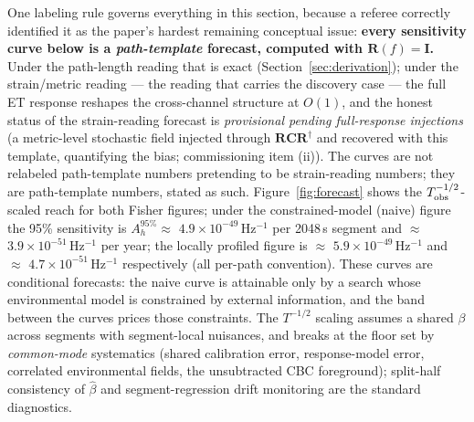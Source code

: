 \documentclass[11pt]{article}
\newcommand{\Ah}{A_h}
\newcommand{\betaeff}{\beta}
\begin{document}
One labeling rule governs everything in this section, because a referee correctly identified it as the paper's hardest remaining conceptual issue: \textbf{every sensitivity curve below is a \emph{path-template} forecast, computed with $\mathbf{R}(f) = \mathbf{I}$.} Under the path-length reading that is exact (Section~\ref{sec:derivation}); under the strain/metric reading --- the reading that carries the discovery case --- the full ET response reshapes the cross-channel structure at $O(1)$, and the honest status of the strain-reading forecast is \emph{provisional pending full-response injections} (a metric-level stochastic field injected through $\mathbf{R}\mathbf{C}\mathbf{R}^\dagger$ and recovered with this template, quantifying the bias; commissioning item (ii)). The curves are not relabeled path-template numbers pretending to be strain-reading numbers; they are path-template numbers, stated as such. Figure~\ref{fig:forecast} shows the $T_{\rm obs}^{-1/2}$-scaled reach for both Fisher figures; under the constrained-model (naive) figure the 95\% sensitivity is $\Ah^{95\%} \approx$ $4.9\times10^{-49}$$\,\mathrm{Hz^{-1}}$ per 2048\,s segment and $\approx$ $3.9\times10^{-51}$$\,\mathrm{Hz^{-1}}$ per year; the locally profiled figure is $\approx$ $5.9\times10^{-49}$$\,\mathrm{Hz^{-1}}$ and $\approx$ $4.7\times10^{-51}$$\,\mathrm{Hz^{-1}}$ respectively (all per-path convention). These curves are conditional forecasts: the naive curve is attainable only by a search whose environmental model is constrained by external information, and the band between the curves prices those constraints. The $T^{-1/2}$ scaling assumes a shared $\betaeff$ across segments with segment-local nuisances, and breaks at the floor set by \emph{common-mode} systematics (shared calibration error, response-model error, correlated environmental fields, the unsubtracted CBC foreground); split-half consistency of $\hat\betaeff$ and segment-regression drift monitoring are the standard diagnostics.
\end{document}
